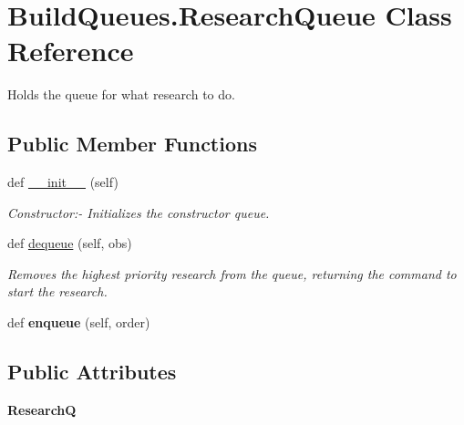 \hypertarget{classBuildQueues_1_1ResearchQueue}{}\section{Build\+Queues.\+Research\+Queue Class Reference}
\label{classBuildQueues_1_1ResearchQueue}


Holds the queue for what research to do.  


\subsection*{Public Member Functions}
\begin{DoxyCompactItemize}
\item 
def \hyperlink{classBuildQueues_1_1ResearchQueue_ad67c60d85072de34bc3ad9076b377bc7}{\+\_\+\+\_\+init\+\_\+\+\_\+} (self)
\begin{DoxyCompactList}\small\item\em Constructor\+:-\/ Initializes the constructor queue. \end{DoxyCompactList}\item 
def \hyperlink{classBuildQueues_1_1ResearchQueue_ac1929cc39d97f4ed8f59b6d6955b3765}{dequeue} (self, obs)
\begin{DoxyCompactList}\small\item\em Removes the highest \textquotesingle{}priority\textquotesingle{} research from the queue, returning the command to start the research. \end{DoxyCompactList}\item 
def {\bfseries enqueue} (self, order)\hypertarget{classBuildQueues_1_1ResearchQueue_af19964b54839fc541ab4201f11d1aedd}{}\label{classBuildQueues_1_1ResearchQueue_af19964b54839fc541ab4201f11d1aedd}

\end{DoxyCompactItemize}
\subsection*{Public Attributes}
\begin{DoxyCompactItemize}
\item 
{\bfseries ResearchQ}\hypertarget{classBuildQueues_1_1ResearchQueue_a4bba8914e159a171e3b18d19c3db632c}{}\label{classBuildQueues_1_1ResearchQueue_a4bba8914e159a171e3b18d19c3db632c}

\end{DoxyCompactItemize}


